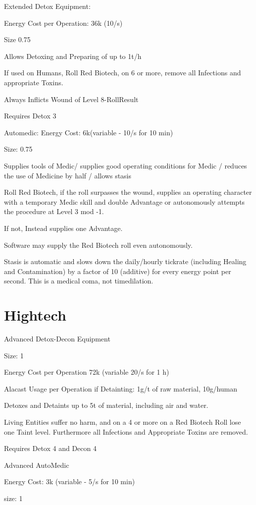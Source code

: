 Extended Detox Equipment:\par
Energy Cost per Operation: 36k (10/s)\par
Size 0.75\par
Allows Detoxing and Preparing of up to 1t/h\par
If used on Humans, Roll Red Biotech, on 6 or more, remove all Infections and appropriate Toxins.\par
Always Inflicts Wound of Level 8-RollResult\par
Requires Detox 3\par
Automedic:
Energy Cost: 6k(variable - 10/s for 10 min)\par
Size: 0.75\par
Supplies tools of Medic/ supplies good operating conditions for Medic / reduces the use of Medicine by half / allows stasis\par
Roll Red Biotech, if the roll surpasses the wound, supplies an operating character with a temporary Medic skill and
double Advantage or autonomously attempts the procedure at Level 3 mod -1.\par
If not, Instead supplies one Advantage.\par
Software may supply the Red Biotech roll even autonomously.\par
Stasis is automatic and slows down the daily/hourly tickrate (including Healing and Contamination) by a factor of 10
(additive) for every energy point per second.
This is a medical coma, not timedilation.
\section{Hightech}\label{sec:hightech}
Advanced Detox-Decon Equipment \par
Size: 1\par
Energy Cost per Operation 72k (variable 20/s for 1 h)\par
Alacast Usage per Operation if Detainting: 1g/t of raw material, 10g/human\par
Detoxes and Detaints up to 5t of material, including air and water.\par
Living Entities suffer no harm, and on a 4 or more on a Red Biotech Roll lose one Taint level.
Furthermore all Infections and Appropriate Toxins are removed.\par
Requires Detox 4 and Decon 4

Advanced AutoMedic\par
Energy Cost: 3k (variable - 5/s for 10 min)\par
size: 1

